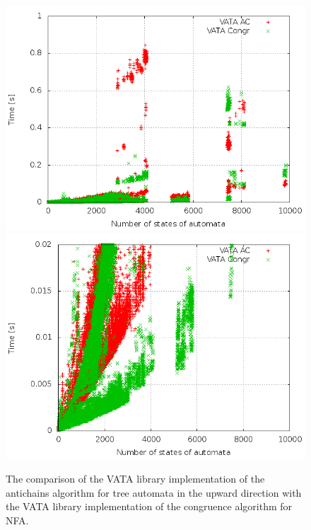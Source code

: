 \begin{figure}
\begin{center}
\includegraphics[scale=0.33]{fig/plot_ac_zprava.png}
\includegraphics[scale=0.33]{fig/plot_ac_step_zprava.png}
\caption{The comparison of the VATA library implementation of the antichains algorithm for tree automata in the upward direction
    with the VATA library implementation of the congruence algorithm for NFA.}
\label{fig:figPlotAc}
\end{center}
\end{figure}

